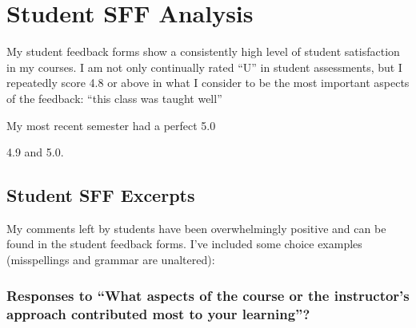 \documentclass[10pt]{article}
\begin{document}
\section{Student SFF Analysis}
My student feedback forms show a consistently high level of student satisfaction in my courses.
I am not only continually rated ``U'' in student assessments, but I repeatedly score 4.8 or above in what I consider to be the most important aspects of the feedback:  ``this class was taught well'' 

My most recent semester had a perfect 5.0


4.9 and 5.0.  

\subsection{Student SFF Excerpts}
My comments left by students have been overwhelmingly positive and can be found in the student feedback forms.
I've included some choice examples (misspellings and grammar are unaltered):

\subsubsection{Responses to ``What aspects of the course or the instructor’s approach contributed most to your learning''?}
\end{document}
